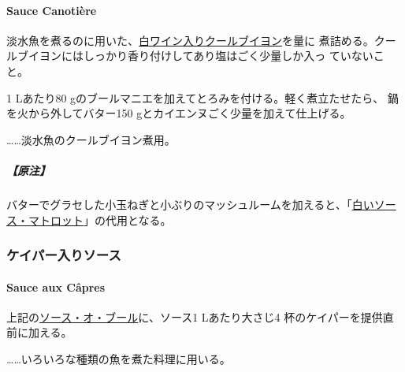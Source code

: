 \begin{recette}
\hypertarget{sauce-canotiere}{%
\paragraph{Sauce Canotière}\label{sauce-canotiere}}


淡水魚を煮るのに用いた、\href{}{白ワイン入りクールブイヨン}を\untiers{}量に
煮詰める。クールブイヨンにはしっかり香り付けしてあり塩はごく少量しか入っ
ていないこと。

1 Lあたり80 gのブールマニエを加えてとろみを付ける。軽く煮立たせたら、
鍋を火から外してバター150 gとカイエンヌごく少量を加えて仕上げる。

\ldots{}\ldots{}淡水魚のクールブイヨン煮用。

\hypertarget{ux539fux6ce8-2}{%
\subparagraph{【原注】}\label{ux539fux6ce8-2}}

バターでグラセした小玉ねぎと小ぶりのマッシュルームを加えると、「\protect\hyperlink{sauce-matelote-blanche}{白いソー
ス・マトロット}」の代用となる。

\maeaki

\hypertarget{ux30b1ux30a4ux30d1ux30fcux5165ux308aux30bdux30fcux30b9}{%
\subsubsection{ケイパー入りソース}\label{ux30b1ux30a4ux30d1ux30fcux5165ux308aux30bdux30fcux30b9}}

\hypertarget{sauce-aux-capres}{%
\paragraph{Sauce aux Câpres}\label{sauce-aux-capres}}


上記の\protect\hyperlink{sauce-au-beurre}{ソース・オ・ブール}に、ソース1
Lあたり大さじ4 杯のケイパーを提供直前に加える。

\ldots{}\ldots{}いろいろな種類の魚を煮た料理に用いる。

\maeaki

\hypertarget{ux30bdux30fcux30b9ux30abux30ebux30c7ux30a3ux30caux30eb21}{%
}
\end{recette}

